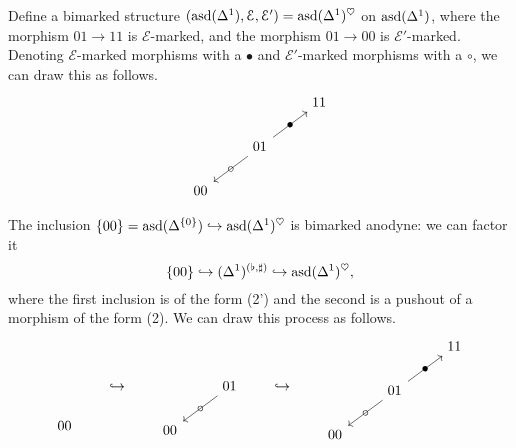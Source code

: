 \documentclass[main.tex]{subfiles}
\begin{document}
\begin{example}
  \label{eg:bimarking_on_asd_delta1}
  Define a bimarked structure $(\mathrm{asd}(\Delta^{1}), \mathcal{E}, \mathcal{E}') = \mathrm{asd}(\Delta^{1})^{\heartsuit}$ on $\mathrm{asd}(\Delta^{1})$, where the morphism $01 \to 11$ is $\mathcal{E}$-marked, and the morphism $01 \to 00$ is $\mathcal{E}'$-marked. Denoting $\mathcal{E}$-marked morphisms with a $\bullet$ and $\mathcal{E}'$-marked morphisms with a $\circ$, we can draw this as follows.
  \begin{equation*}
    \begin{tikzcd}
      && 11
      \\
      & 01
      \arrow[ur, "\bullet" marking]
      \arrow[dl, "\circ" marking]
      \\
      00
    \end{tikzcd}
  \end{equation*}

  The inclusion $\{00\} = \mathrm{asd}(\Delta^{\{0\}}) \hookrightarrow \mathrm{asd}(\Delta^{1})^{\heartsuit}$ is bimarked anodyne: we can factor it
  \begin{equation*}
    \{00\} \hookrightarrow (\Delta^{1})^{(\flat, \sharp)} \hookrightarrow \mathrm{asd}(\Delta^{1})^{\heartsuit},
  \end{equation*}
  where the first inclusion is of the form (2') and the second is a pushout of a morphism of the form (2). We can draw this process as follows.
  \begin{equation*}
    \begin{tikzcd}
      \
      \\
      \
      \\
      00
    \end{tikzcd}
    \qquad\hookrightarrow\qquad
    \begin{tikzcd}
      & \
      \\
      & 01
      \arrow[dl, "\circ" marking]
      \\
      00
    \end{tikzcd}
    \qquad\hookrightarrow\qquad
    \begin{tikzcd}
      && 11
      \\
      & 01
      \arrow[ur, "\bullet" marking]
      \arrow[dl, "\circ" marking]
      \\
      00
    \end{tikzcd}
  \end{equation*}
\end{example}
\end{document}
